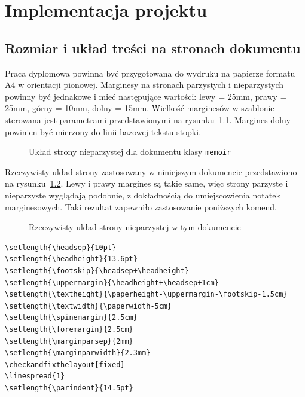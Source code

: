 \chapter{Implementacja projektu}
\section{Rozmiar i układ treści na stronach dokumentu}
Praca dyplomowa powinna być przygotowana do wydruku na papierze formatu A4 w orientacji pionowej.
Marginesy na stronach parzystych i nieparzystych powinny być jednakowe i mieć następujące wartości:
lewy = 25mm, prawy = 25mm, górny = 10mm, dolny = 15mm. Wielkość marginesów w szablonie sterowana jest parametrami przedstawionymi na rysunku~\ref{fig:pageLayout}. Margines dolny powinien być mierzony do linii bazowej tekstu stopki.
\begin{figure}[htb]
\currentpage
\drawparameterstrue
\oddpagelayoutfalse
\drawstock
\caption{Układ strony nieparzystej dla dokumentu klasy \texttt{memoir}} \label{fig:pageLayout}
\end{figure}

Rzeczywisty układ strony zastosowany w niniejszym dokumencie przedstawiono na rysunku~\ref{fig:currentPageLayout}. Lewy i prawy margines są takie same, więc strony parzyste i nieparzyste wyglądają podobnie, z dokładnością do umiejscowienia notatek marginesowych. Taki rezultat zapewniło zastosowanie poniższych komend. 
\begin{figure}[t]
\currentstock
\oddpagelayouttrue
\twocolumnlayoutfalse
\drawmarginparstrue
\drawparametersfalse
\drawstock
\caption{Rzeczywisty układ strony nieparzystej w tym dokumencie} \label{fig:currentPageLayout}
\end{figure}

\begin{lstlisting}[basicstyle=\footnotesize\ttfamily]
\setlength{\headsep}{10pt} 
\setlength{\headheight}{13.6pt} 
\setlength{\footskip}{\headsep+\headheight}
\setlength{\uppermargin}{\headheight+\headsep+1cm}
\setlength{\textheight}{\paperheight-\uppermargin-\footskip-1.5cm}
\setlength{\textwidth}{\paperwidth-5cm}
\setlength{\spinemargin}{2.5cm}
\setlength{\foremargin}{2.5cm}
\setlength{\marginparsep}{2mm}
\setlength{\marginparwidth}{2.3mm}
\checkandfixthelayout[fixed] 
\linespread{1}
\setlength{\parindent}{14.5pt}
\end{lstlisting}





